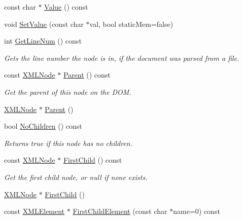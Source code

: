 \begin{DoxyCompactItemize}
\item 
const char $\ast$ \mbox{\hyperlink{classtinyxml2_1_1_x_m_l_node_a0485e51c670e741884cfd8362274d680}{Value}} () const
\item 
void \mbox{\hyperlink{classtinyxml2_1_1_x_m_l_node_a09dd68cf9eae137579f6e50f36487513}{Set\+Value}} (const char $\ast$val, bool static\+Mem=false)
\item 
int \mbox{\hyperlink{classtinyxml2_1_1_x_m_l_node_a9b5fc636646fda761d342c72e91cb286}{Get\+Line\+Num}} () const
\begin{DoxyCompactList}\small\item\em Gets the line number the node is in, if the document was parsed from a file. \end{DoxyCompactList}\item 
const \mbox{\hyperlink{classtinyxml2_1_1_x_m_l_node}{X\+M\+L\+Node}} $\ast$ \mbox{\hyperlink{classtinyxml2_1_1_x_m_l_node_ae0f62bc186c56c2e0483ebd52dbfbe34}{Parent}} () const
\begin{DoxyCompactList}\small\item\em Get the parent of this node on the D\+OM. \end{DoxyCompactList}\item 
\mbox{\hyperlink{classtinyxml2_1_1_x_m_l_node}{X\+M\+L\+Node}} $\ast$ \mbox{\hyperlink{classtinyxml2_1_1_x_m_l_node_a76029693a5a54fbb721a41d7a0ca8a97}{Parent}} ()
\item 
bool \mbox{\hyperlink{classtinyxml2_1_1_x_m_l_node_ac3ab489e6e202a3cd1762d3b332e89d4}{No\+Children}} () const
\begin{DoxyCompactList}\small\item\em Returns true if this node has no children. \end{DoxyCompactList}\item 
const \mbox{\hyperlink{classtinyxml2_1_1_x_m_l_node}{X\+M\+L\+Node}} $\ast$ \mbox{\hyperlink{classtinyxml2_1_1_x_m_l_node_ae7dc225e1018cdd685f7563593a1fe08}{First\+Child}} () const
\begin{DoxyCompactList}\small\item\em Get the first child node, or null if none exists. \end{DoxyCompactList}\item 
\mbox{\hyperlink{classtinyxml2_1_1_x_m_l_node}{X\+M\+L\+Node}} $\ast$ \mbox{\hyperlink{classtinyxml2_1_1_x_m_l_node_a2d6c70c475146b48bc93a7fafdeff5e0}{First\+Child}} ()
\item 
const \mbox{\hyperlink{classtinyxml2_1_1_x_m_l_element}{X\+M\+L\+Element}} $\ast$ \mbox{\hyperlink{classtinyxml2_1_1_x_m_l_node_a1bec132dcf085284e0a10755f2cf0d57}{First\+Child\+Element}} (const char $\ast$name=0) const

\end{DoxyCompactItemize}
